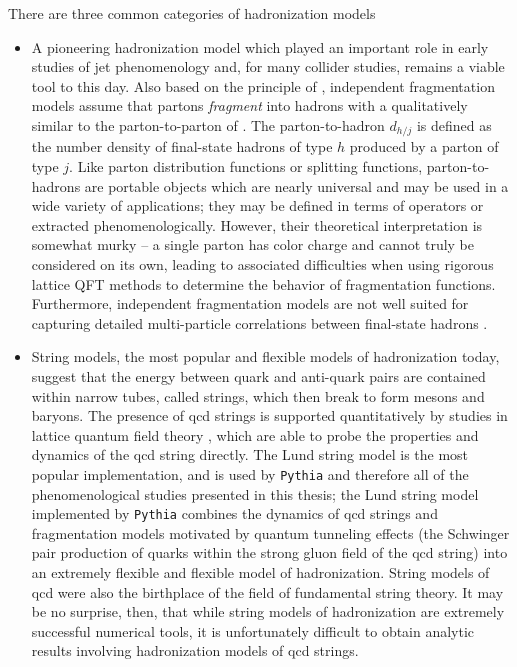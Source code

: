 \begin{subappendices}
There are three common categories of hadronization models
\begin{itemize}
    \item

        A pioneering hadronization model which played an important role in early studies of jet phenomenology and, for many collider studies, remains a viable tool to this day.
        Also based on the principle of , independent fragmentation models assume that partons \textit{fragment} into hadrons with a  qualitatively similar to the \gls{parton-to-parton} of  \cite{}.
        The \gls{parton-to-hadron} \(d_{h/j}\) is defined as the number density of final-state hadrons of type \(h\) produced by a parton of type \(j\).
        Like parton distribution functions or splitting functions, \glspl{parton-to-hadron} are portable objects which are nearly universal and may be used in a wide variety of applications;
        they may be defined in terms of operators or extracted phenomenologically.
        However, their theoretical interpretation is somewhat murky -- a single parton has color charge and cannot truly be considered on its own, leading to associated difficulties when using rigorous lattice QFT methods to determine the behavior of fragmentation functions.
        Furthermore, independent fragmentation models are not well suited for capturing detailed multi-particle correlations between final-state hadrons \cite{}.


    \item

        String models, the most popular and flexible models of hadronization today, suggest that the energy between quark and anti-quark pairs are contained within narrow tubes, called strings, which then break to form mesons and baryons.
        The presence of \gls{qcd} strings is supported quantitatively by studies in lattice quantum field theory \cite{}, which are able to probe the properties and dynamics of the \gls{qcd} string directly.
        The Lund string model is the most popular implementation, and is used by \texttt{Pythia} \cite{} and therefore all of the phenomenological studies presented in this thesis;
        the Lund string model implemented by \texttt{Pythia} combines the dynamics of \gls{qcd} strings and fragmentation models motivated by quantum tunneling effects (the Schwinger pair production of quarks within the strong gluon field of the \gls{qcd} string) into an extremely flexible and flexible model of hadronization.
        String models of \gls{qcd} were also the birthplace of the field of fundamental string theory.
        It may be no surprise, then, that while string models of hadronization are extremely successful numerical tools, it is unfortunately difficult to obtain analytic results involving hadronization models of \gls{qcd} strings.


\end{itemize}
\end{subappendices}
